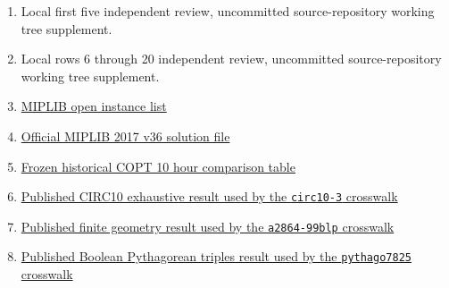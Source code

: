 \documentclass[11pt,letterpaper]{article}
\begin{document}
\begin{enumerate}
\item\label{ref:first-five} Local first five independent review, uncommitted source-repository working tree supplement.\newline
\texttt{}
\item\label{ref:rows-six-twenty} Local rows 6 through 20 independent review, uncommitted source-repository working tree supplement.\newline
\texttt{}
\item\label{ref:miplib} \href{\detokenize{https://miplib.zib.de/tag_open.html}}{MIPLIB open instance list}
\item\label{ref:v36} \href{\detokenize{https://miplib.zib.de/downloads/miplib2017-v36.solu}}{Official MIPLIB 2017 v36 solution file}
\item\label{ref:copt-table} \href{\detokenize{https://github.com/Huangyc98/MIPLIB_openproblem/blob/89a8abd0847941bdf774353a1983d5e6a00457a0/docs/comparisons/copt-10h-vs-github-20260907/current-improvements-20260908.zh.md}}{Frozen historical COPT 10 hour comparison table}
\item\label{ref:circ-paper} \href{\detokenize{https://doi.org/10.1007/s10951-011-0237-x}}{Published CIRC10 exhaustive result used by the \texttt{circ10-3} crosswalk}
\item\label{ref:a2864-paper} \href{\detokenize{https://doi.org/10.1007/s10623-018-0544-8}}{Published finite geometry result used by the \texttt{a2864-99blp} crosswalk}
\item\label{ref:pythago-paper} \href{\detokenize{https://arxiv.org/abs/1605.00723}}{Published Boolean Pythagorean triples result used by the \texttt{pythago7825} crosswalk}
\end{enumerate}
\end{document}
